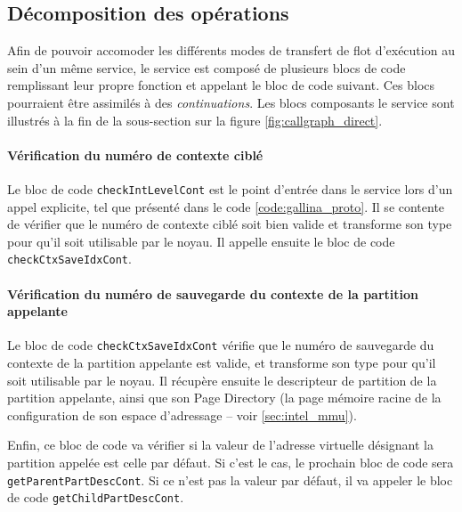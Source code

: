 		\subsection{Décomposition des opérations}

		Afin de pouvoir accomoder les différents modes de transfert de flot d'exécution au sein d'un même service, le service est composé de plusieurs blocs de code remplissant leur propre fonction et appelant le bloc de code suivant. Ces blocs pourraient être assimilés à des \emph{continuations}. Les blocs composants le service sont illustrés à la fin de la sous-section sur la figure \ref{fig:callgraph_direct}.

		\paragraph{Vérification du numéro de contexte ciblé}

		Le bloc de code \texttt{checkIntLevelCont} est le point d'entrée dans le service lors d'un appel explicite, tel que présenté dans le code \ref{code:gallina_proto}.
		Il se contente de vérifier que le numéro de contexte ciblé soit bien valide et transforme son type pour qu'il soit utilisable par le noyau. Il appelle ensuite le bloc de code \texttt{checkCtxSaveIdxCont}.


		\paragraph{Vérification du numéro de sauvegarde du contexte de la partition appelante}
		
		Le bloc de code \texttt{checkCtxSaveIdxCont} vérifie que le numéro de sauvegarde du contexte de la partition appelante est valide, et transforme son type pour qu'il soit utilisable par le noyau. Il récupère ensuite le descripteur de partition de la partition appelante, ainsi que son Page Directory (la page mémoire racine de la configuration de son espace d'adressage -- voir \ref{sec:intel_mmu}).

		Enfin, ce bloc de code va vérifier si la valeur de l'adresse virtuelle désignant la partition appelée est celle par défaut. Si c'est le cas, le prochain bloc de code sera \texttt{getParentPartDescCont}. Si ce n'est pas la valeur par défaut, il va appeler le bloc de code \texttt{getChildPartDescCont}.

